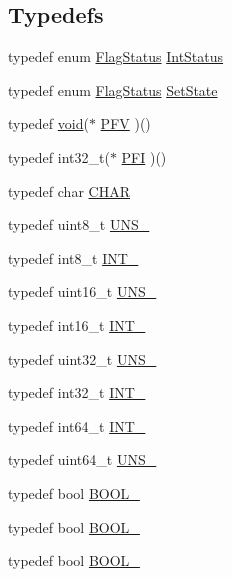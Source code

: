 \subsection*{Typedefs}
\begin{DoxyCompactItemize}
\item 
typedef enum \hyperlink{group__LPC__Types__Public__Types_ga89136caac2e14c55151f527ac02daaff}{Flag\-Status} \hyperlink{group__LPC__Types__Public__Types_gab7d263072f745b4f3913fb0afc434c4e}{Int\-Status}
\item 
typedef enum \hyperlink{group__LPC__Types__Public__Types_ga89136caac2e14c55151f527ac02daaff}{Flag\-Status} \hyperlink{group__LPC__Types__Public__Types_ga7fab312a9f10f1386a955977d2ec96fe}{Set\-State}
\item 
typedef \hyperlink{Paradigm_2Tern__EE_2small_2portmacro_8h_a14d32f8130d3c0b212cfc751730b5b49}{void}($\ast$ \hyperlink{group__LPC__Types__Public__Types_ga2d6ebcfe3babcb204d017c685825a4d8}{P\-F\-V} )()
\item 
typedef int32\-\_\-t($\ast$ \hyperlink{group__LPC__Types__Public__Types_ga39628beaa6435daa2ae29ba204c920da}{P\-F\-I} )()
\item 
typedef char \hyperlink{group__LPC__Types__Public__Types_gaebb9e13210d88d43e32e735ada43a425}{C\-H\-A\-R}
\item 
typedef uint8\-\_\-t \hyperlink{group__LPC__Types__Public__Types_ga7353117656180c64d2216c874998b98b}{U\-N\-S\-\_}
\item 
typedef int8\-\_\-t \hyperlink{group__LPC__Types__Public__Types_gac172005ce53b001f50a677cc10bd17b0}{I\-N\-T\-\_}
\item 
typedef uint16\-\_\-t \hyperlink{group__LPC__Types__Public__Types_gafce87a7f2271b2cf38d7532f157f8a50}{U\-N\-S\-\_}
\item 
typedef int16\-\_\-t \hyperlink{group__LPC__Types__Public__Types_gaae6e34a91bf60db05de64de7720df9a5}{I\-N\-T\-\_}
\item 
typedef uint32\-\_\-t \hyperlink{group__LPC__Types__Public__Types_ga28adf5c6b1811ca447826319598d8aba}{U\-N\-S\-\_}
\item 
typedef int32\-\_\-t \hyperlink{group__LPC__Types__Public__Types_ga3a17614f3a1b67eaf20781d8ec16a652}{I\-N\-T\-\_}
\item 
typedef int64\-\_\-t \hyperlink{group__LPC__Types__Public__Types_ga1a0aab29eee6b306564084e005fa5750}{I\-N\-T\-\_}
\item 
typedef uint64\-\_\-t \hyperlink{group__LPC__Types__Public__Types_ga2299199b92f0535ad8c2e2d8c7c7f09b}{U\-N\-S\-\_}
\item 
typedef bool \hyperlink{group__LPC__Types__Public__Types_gab02ba567b91b6b3d3c0c0209b2f577a0}{B\-O\-O\-L\-\_}
\item 
typedef bool \hyperlink{group__LPC__Types__Public__Types_ga586a49bf86982ab05295515d1e4e35fe}{B\-O\-O\-L\-\_}
\item 
typedef bool \hyperlink{group__LPC__Types__Public__Types_ga7cc7a8cc54a0a73fbfcc1eb0b792148d}{B\-O\-O\-L\-\_}
\end{DoxyCompactItemize}
